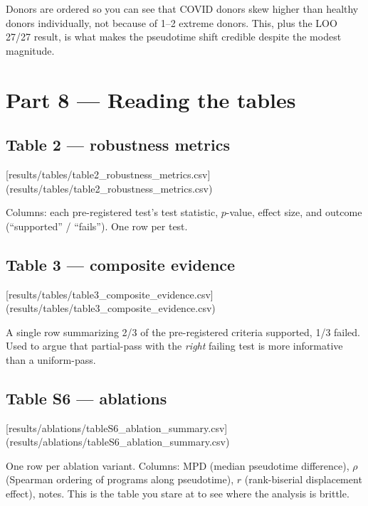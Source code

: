 \documentclass[11pt]{article}
\begin{document}
\begin{resultbox}
Donors are ordered so you can see that COVID donors skew higher than healthy
donors individually, not because of 1--2 extreme donors. This, plus the
LOO 27/27 result, is what makes the pseudotime shift credible despite
the modest magnitude.
\end{resultbox}

\section{Part 8 --- Reading the tables}

\subsection{Table 2 --- robustness metrics}

[results/tables/table2\_robustness\_metrics.csv](results/tables/table2_robustness_metrics.csv)

Columns: each pre-registered test's test statistic, $p$-value, effect size,
and outcome (``supported'' / ``fails''). One row per test.

\subsection{Table 3 --- composite evidence}

[results/tables/table3\_composite\_evidence.csv](results/tables/table3_composite_evidence.csv)

A single row summarizing 2/3 of the pre-registered criteria supported,
1/3 failed. Used to argue that partial-pass with the \emph{right} failing
test is more informative than a uniform-pass.

\subsection{Table S6 --- ablations}

[results/ablations/tableS6\_ablation\_summary.csv](results/ablations/tableS6_ablation_summary.csv)

One row per ablation variant. Columns: MPD (median pseudotime difference),
$\rho$ (Spearman ordering of programs along pseudotime), $r$ (rank-biserial
displacement effect), notes. This is the table you stare at to see where the
analysis is brittle.
\end{document}
